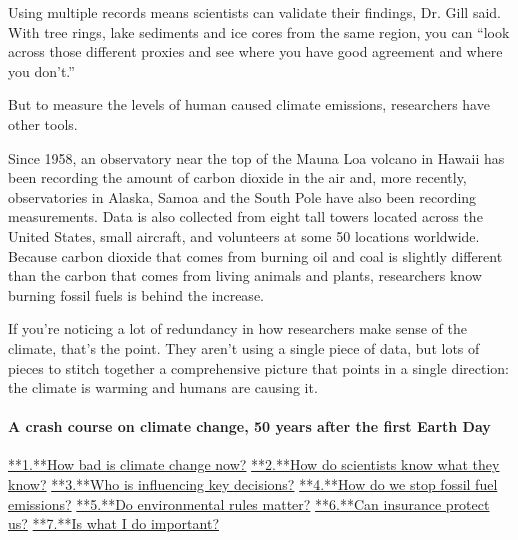 Using multiple records means scientists can validate their findings, Dr.
Gill said. With tree rings, lake sediments and ice cores from the same
region, you can ``look across those different proxies and see where you
have good agreement and where you don't.''

But to measure the levels of human caused climate emissions, researchers
have other tools.

Since 1958, an observatory near the top of the Mauna Loa volcano in
Hawaii has been recording the amount of carbon dioxide in the air and,
more recently, observatories in Alaska, Samoa and the South Pole have
also been recording measurements. Data is also collected from eight tall
towers located across the United States, small aircraft, and volunteers
at some 50 locations worldwide. Because carbon dioxide that comes from
burning oil and coal is slightly different than the carbon that comes
from living animals and plants, researchers know burning fossil fuels is
behind the increase.

If you're noticing a lot of redundancy in how researchers make sense of
the climate, that's the point. They aren't using a single piece of data,
but lots of pieces to stitch together a comprehensive picture that
points in a single direction: the climate is warming and humans are
causing it.

\hypertarget{a-crash-course-on-climate-change-50-years-after-the-first-earth-day-2}{%
\paragraph{A crash course on climate change, 50 years after the first
Earth
Day}\label{a-crash-course-on-climate-change-50-years-after-the-first-earth-day-2}}

\href{/interactive/2020/04/19/climate/climate-crash-course-1.html}{**1.**How
bad is climate change now?}
\href{/interactive/2020/04/19/climate/climate-crash-course-2.html}{**2.**How
do scientists know what they know?}
\href{/interactive/2020/04/19/climate/climate-crash-course-3.html}{**3.**Who
is influencing key decisions?}
\href{/interactive/2020/04/19/climate/climate-crash-course-4.html}{**4.**How
do we stop fossil fuel emissions?}
\href{/interactive/2020/04/19/climate/climate-crash-course-5.html}{**5.**Do
environmental rules matter?}
\href{/interactive/2020/04/19/climate/climate-crash-course-6.html}{**6.**Can
insurance protect us?}
\href{/interactive/2020/04/19/climate/climate-crash-course-7.html}{**7.**Is
what I do important?}

